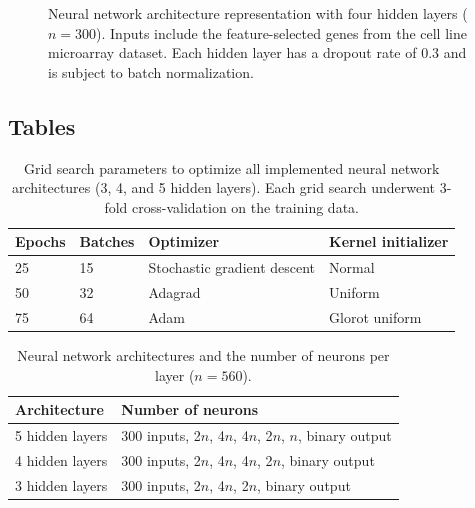 \documentclass[10pt, letterpaper]{article}
\begin{document}
\begin{figure}[!ht]
    \caption{Neural network architecture representation with four hidden layers ($n=300$). Inputs include the feature-selected genes from the cell line microarray dataset. Each hidden layer has a dropout rate of 0.3 and is subject to batch normalization.}
    \label{fig:neural_vis}
\end{figure}


\subsection*{Tables}
\begin{table}[!ht]
    \caption{Grid search parameters to optimize all implemented neural network architectures (3, 4, and 5 hidden layers). Each grid search underwent 3-fold cross-validation on the training data.}
    \centering
    \label{tab:params}
    \begin{tabular}{l l l l}
        \toprule
        Epochs & Batches & Optimizer & Kernel initializer \\
        \midrule
        25 & 15 & Stochastic gradient descent & Normal \\
        50 & 32 & Adagrad & Uniform \\
        75 & 64 & Adam & Glorot uniform \\
        \bottomrule
    \end{tabular}
\end{table}


\begin{table}[!ht]
	\caption{Neural network architectures and the number of neurons per layer ($n=560$).}	\label{tab:architectures}
	\centering
	\begin{tabular}{l l}
		\toprule
		Architecture & Number of neurons \\
		\midrule
		 5 hidden layers & 300 inputs, 2$n$, 4$n$, 4$n$, 2$n$, $n$, binary output \\
		 4  hidden layers & 300 inputs, 2$n$, 4$n$, 4$n$, 2$n$, binary output \\
		 3 hidden layers & 300 inputs, 2$n$, 4$n$, 2$n$, binary output \\
		\bottomrule
	\end{tabular}
\end{table}
\end{document}
